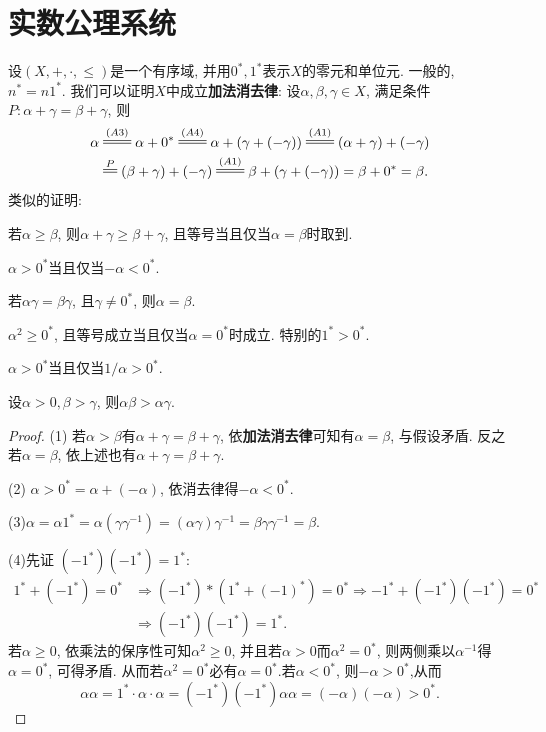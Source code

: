 \section{实数公理系统}
\begin{quiza}
\woe 设\((X,+,\cdot,\leqslant)\)是一个有序域, 并用\(0^*,1^*\)表示\(X\)的零元和单位元. 一般的, \(n^*=n1^*\). 我们可以证明\(X\)中成立\textbf{加法消去律}: 设\(\alpha,\beta,\gamma\in X\), 满足条件\(P:\alpha+\gamma=\beta+\gamma\), 则
\[\begin{split}
\alpha&\ndtstile{{}}{{(A3)}}\alpha+0^*\ndtstile{{}}{{(A4)}}\alpha+\left(\gamma+(-\gamma)\right)\ndtstile{{}}{{(A1)}}(\alpha+\gamma)+(-\gamma)\\
&\ndtstile{{}}{{P}}(\beta+\gamma)+(-\gamma)\ndtstile{{}}{{(A1)}}\beta+\left(\gamma+(-\gamma)\right)=\beta+0^*=\beta.
\end{split}\]类似的证明: 
\begin{quizcs}
\item 若\(\alpha\geqslant \beta\), 则\(\alpha+\gamma\geqslant \beta+\gamma\), 且等号当且仅当\(\alpha=\beta\)时取到.
\item \(\alpha>0^*\)当且仅当\(-\alpha<0^*\).
\item 若\(\alpha\gamma=\beta\gamma\), 且\(\gamma\ne 0^*\), 则\(\alpha=\beta\).
\item \(\alpha^2\geqslant 0^*\), 且等号成立当且仅当\(\alpha=0^*\)时成立. 特别的\(1^*>0^*\).
\item \(\alpha>0^*\)当且仅当\(1/\alpha>0^*\).
\item 设\(\alpha>0,\beta>\gamma\), 则\(\alpha\beta>\alpha\gamma.\)
\end{quizcs}
\begin{proof}
(1) 若\(\alpha>\beta\)有\(\alpha+\gamma=\beta+\gamma\), 依\textbf{加法消去律}可知有\(\alpha=\beta\), 与假设矛盾. 反之若\(\alpha=\beta\), 依上述也有\(\alpha+\gamma=\beta+\gamma\).

(2) \(\alpha>0^*=\alpha+(-\alpha)\), 依消去律得\(-\alpha<0^*\).

(3)\(\alpha=\alpha 1^*=\alpha(\gamma\gamma^{-1})=(\alpha\gamma)\gamma^{-1}=\beta\gamma\gamma^{-1}=\beta.\)

(4)先证 \((-1^*)(-1^*)=1^*\):\[\begin{split}
                1^*+(-1^*)=0^*&\Rightarrow (-1^*)*(1^*+(-1)^*)=0^*\Rightarrow -1^*+(-1^*)(-1^*)=0^*\\
                &\Rightarrow (-1^*)(-1^*)=1^*.
            \end{split}\]
若\(\alpha\geqslant 0\), 依乘法的保序性可知\(\alpha^2\geqslant 0\), 并且若\(\alpha>0\)而\(\alpha^2=0^*\), 则两侧乘以\(\alpha^{-1}\)得\(\alpha=0^*\), 可得矛盾. 从而若\(\alpha^2=0^*\)必有\(\alpha= 0^*\).若\(\alpha <0^*\), 则\(-\alpha>0^*\),从而\[\alpha\alpha=1^*\cdot \alpha\cdot\alpha=(-1^*)(-1^*)\alpha\alpha=(-\alpha)(-\alpha)>0^*.\]


\end{proof}
\end{quiza}
